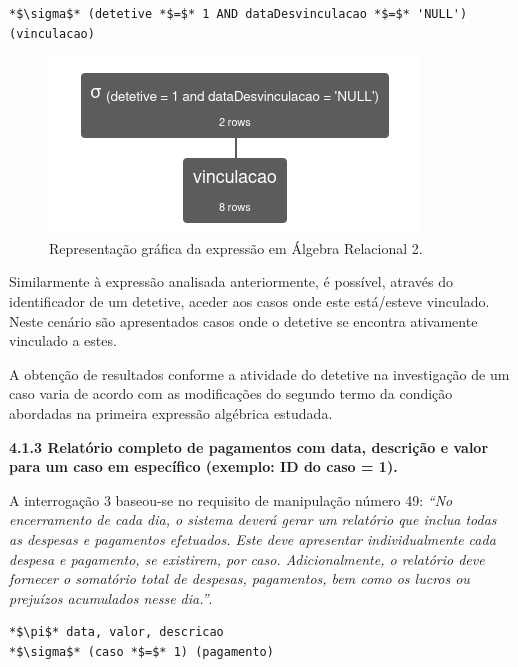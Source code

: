 \documentclass[a4paper,12pt]{scrreprt}
\begin{document}
\begin{lstlisting}[escapechar=*]
*$\sigma$* (detetive *$=$* 1 AND dataDesvinculacao *$=$* 'NULL') (vinculacao)
\end{lstlisting}

\begin{figure}[!ht]
    \centering
    \includegraphics[scale=0.9]{images/relax/2.png}
    \caption{Representação gráfica da expressão em Álgebra Relacional 2.}
\end{figure}
\vspace{0.2cm}

Similarmente à expressão analisada anteriormente, é possível, através do identificador de um detetive, aceder aos casos onde este está/esteve vinculado. Neste cenário são apresentados casos onde o detetive se encontra ativamente vinculado a estes.

A obtenção de resultados conforme a atividade do detetive na investigação de um caso varia de acordo com as modificações do segundo termo da condição abordadas na primeira expressão algébrica estudada.

\clearpage %
{\large\textbf{4.1.3 Relatório completo de pagamentos com data, descrição e valor para um caso em específico (exemplo: ID do caso = 1).}}

\vspace{0.2cm}

A interrogação 3 baseou-se no requisito de manipulação número 49: \textit{“No encerramento de cada dia, o sistema deverá gerar um relatório que inclua todas as despesas e pagamentos efetuados. Este deve apresentar individualmente cada despesa e pagamento, se existirem, por caso. Adicionalmente, o relatório deve fornecer o somatório total de despesas, pagamentos, bem como os lucros ou prejuízos acumulados nesse dia.”}.

\vspace{0.2cm}

\begin{lstlisting}[escapechar=*]
*$\pi$* data, valor, descricao
*$\sigma$* (caso *$=$* 1) (pagamento)
\end{lstlisting}
\end{document}
